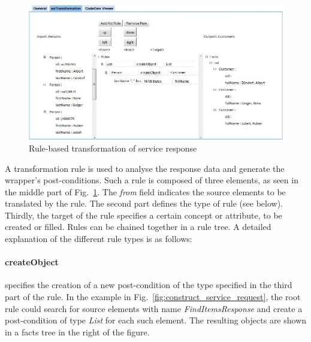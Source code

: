 \begin{figure}
  \begin{center}     
    \includegraphics[height=\linewidth, angle=90]{images/ServiceWrapperToolGVSWithTransformationRules.png}
    \caption{Rule-based transformation of service response}
    \label{fig:response_service_execution}
  \end{center}
\end{figure}

A transformation rule is used to analyse the response data and generate the wrapper's post-conditions. Such a rule is composed of three elements, as seen in the middle part of Fig.~\ref{fig:response_service_execution}. The \textit{from} field indicates the source elements to be translated by the rule. The second part defines the type of rule (see below). Thirdly, the target of the rule specifies a certain concept or attribute, to be created or filled. Rules can be chained together in a rule tree. A detailed explanation of the different rule types is as follows:

\paragraph{createObject} %
\label{par:createobject}

specifies the creation of a new post-condition of the type specified in the third part of the rule. In the example in Fig.~\ref{fig:construct_service_request}, the root rule could search for source elements with name \emph{FindItemsResponse} and create a post-condition of type \emph{List} for each such element. The resulting objects are shown in a facts tree in the right of the figure.

